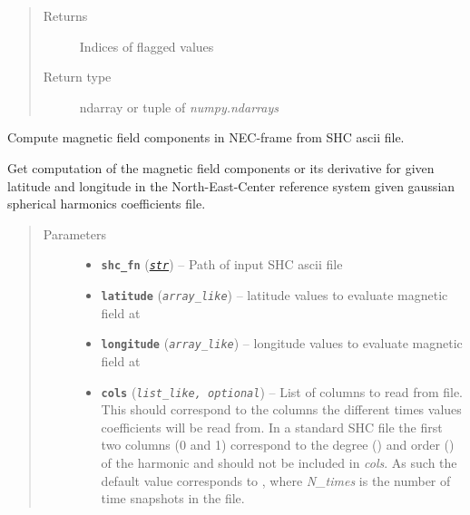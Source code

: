 \documentclass[letterpaper,10pt,english]{sphinxhowto}
\begin{document}
\begin{fulllineitems}
\begin{quote}
\begin{description}
\begin{itemize}
\end{itemize}

\item[{Returns}] \leavevmode
Indices of flagged values

\item[{Return type}] \leavevmode
ndarray or tuple of \emph{numpy.ndarrays}

\end{description}\end{quote}

\end{fulllineitems}


\begin{fulllineitems}
\label{swtools_doc:swtools.get_Bnec}
Compute magnetic field components in NEC-frame from SHC ascii file.

Get computation of the magnetic field components or its derivative
for given latitude and longitude in the North-East-Center reference
system given gaussian spherical harmonics coefficients file.
\begin{quote}\begin{description}
\item[{Parameters}] \leavevmode\begin{itemize}
\item {} 
\textbf{\texttt{shc\_fn}} (\href{https://docs.python.org/library/functions.html\#str}{\emph{\texttt{str}}}) -- Path of input SHC ascii file

\item {} 
\textbf{\texttt{latitude}} (\emph{\texttt{array\_like}}) -- latitude values to evaluate magnetic field at

\item {} 
\textbf{\texttt{longitude}} (\emph{\texttt{array\_like}}) -- longitude values to evaluate magnetic field at

\item {} 
\textbf{\texttt{cols}} (\emph{\texttt{list\_like, optional}}) -- List of columns to read from file. This should correspond to the
columns the different times values coefficients will be
read from. In a standard SHC file the first two columns (0 and 1)
correspond to the degree () and order () of the
harmonic and should not be included in \emph{cols}. As such the default
value  corresponds to ,
where \emph{N\_times} is the number of time snapshots in the file.


\end{itemize}
\end{description}
\end{quote}
\end{fulllineitems}
\end{document}
